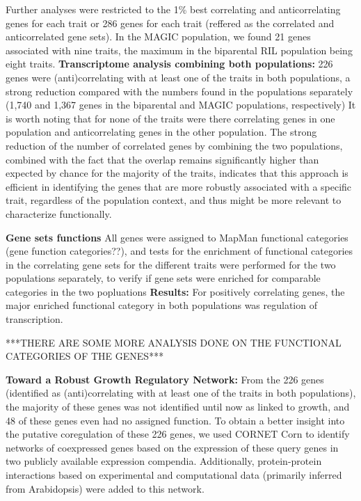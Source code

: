 \documentclass[a4paper,10pt]{article}
\begin{document}
Further analyses were restricted to the 1\% best correlating and anticorrelating genes for each trait or 286 genes for each trait (reffered as the correlated and anticorrelated gene sets).
In the MAGIC population, we found 21 genes associated with nine traits, the maximum in the biparental RIL population being eight traits.
\textbf{Transcriptome analysis combining both populations:} 226 genes were (anti)correlating with at least one of the traits in both populations, a strong reduction compared with the numbers found in the populations separately (1,740 and 1,367 genes in the biparental and MAGIC populations, respectively)
It is worth noting that for none of the traits were there correlating genes in one population and anticorrelating genes in the other population.
The strong reduction of the number of correlated genes by combining the two populations, combined with the fact that the overlap remains significantly higher than expected by chance for the majority of the traits, indicates that this approach is efficient in identifying the genes that are more robustly associated with a specific trait, regardless of the population context, and thus might be more relevant to characterize functionally.
 
\textbf{Gene sets functions} All genes were assigned to MapMan functional categories (gene function categories??), and tests for the enrichment of functional categories in the correlating gene sets for the different traits were performed for the two populations separately, to verify if gene sets were enriched for comparable categories in the two popluations
\textbf{Results:} For positively correlating genes, the major enriched functional category in both populations was regulation of transcription.

***THERE ARE SOME MORE ANALYSIS DONE ON THE FUNCTIONAL CATEGORIES OF THE GENES***

\textbf{Toward a Robust Growth Regulatory Network:} From the 226 genes (identified as (anti)correlating with at least one of the traits in both populations), the majority of these genes was not identified until now as linked to growth, and 48 of these genes even had no assigned function.
To obtain a better insight into the putative coregulation of these 226 genes, we used CORNET Corn to identify networks of coexpressed genes based on the expression of these query genes in two publicly available expression compendia. Additionally, protein-protein interactions
based on experimental and computational data (primarily inferred from Arabidopsis) were added to this network.
\end{document}
